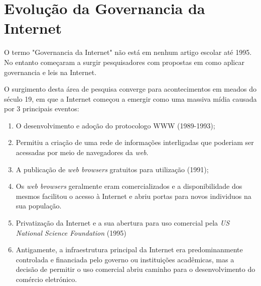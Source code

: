 \section{Evolução da Governancia da Internet}
\label{sec:governanceevo}
O termo "Governancia da Internet" não está em nenhum artigo escolar até 1995. No entanto começaram a surgir pesquisadores com propostas em como aplicar 
governancia e leis na Internet.

O surgimento desta área de pesquisa converge para acontecimentos em meados do século 19, 
em que a Internet começou a emergir como uma massiva mídia
causada por 3 principais eventos:

\begin{enumerate}
  \item O desenvolvimento e adoção do protocologo WWW (1989-1993);
  \item[]Permitiu a criação de uma rede de informações interligadas que poderiam
  ser acessadas por meio de navegadores da \textit{web}.
  
  \item A publicação de \textit{web browsers} gratuitos para utilização (1991);
  
  \item[]Os \textit{web browsers} geralmente eram comercializados e a disponibilidade dos mesmos 
  facilitou o acesso à Internet e abriu portas para novos individuos na sua população.
  \item Privatização da Internet e a sua abertura para uso comercial pela \textit{US National Science Foundation} (1995) 

  \item[]Antigamente, a infraestrutura principal da Internet era predominanmente controlada e financiada pelo
  governo ou instituições acadêmicas, mas a decisão de permitir o uso comercial abriu caminho
  para o desenvolvimento do comércio eletrónico.


\end{enumerate}
